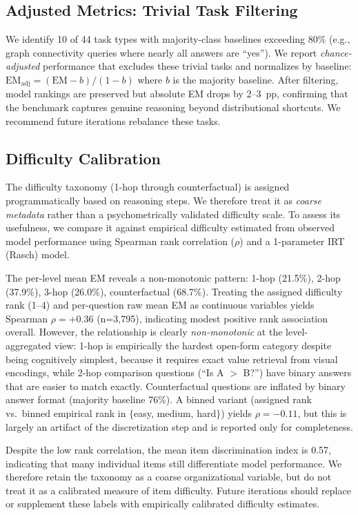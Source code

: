 \documentclass{article}
\begin{document}
\subsection{Adjusted Metrics: Trivial Task Filtering}
We identify 10 of 44 task types with majority-class baselines exceeding 80\% (e.g., graph connectivity queries where nearly all answers are ``yes''). We report \emph{chance-adjusted} performance that excludes these trivial tasks and normalizes by baseline: $\mathrm{EM}_{\mathrm{adj}} = (\mathrm{EM} - b) / (1 - b)$ where $b$ is the majority baseline. After filtering, model rankings are preserved but absolute EM drops by 2--3~pp, confirming that the benchmark captures genuine reasoning beyond distributional shortcuts. We recommend future iterations rebalance these tasks.

\subsection{Difficulty Calibration}
The difficulty taxonomy (1-hop through counterfactual) is assigned programmatically based on reasoning steps. We therefore treat it as \emph{coarse metadata} rather than a psychometrically validated difficulty scale. To assess its usefulness, we compare it against empirical difficulty estimated from observed model performance using Spearman rank correlation ($\rho$) and a 1-parameter IRT (Rasch) model.

The per-level mean EM reveals a non-monotonic pattern: 1-hop (21.5\%), 2-hop (37.9\%), 3-hop (26.0\%), counterfactual (68.7\%). Treating the assigned difficulty rank (1--4) and per-question raw mean EM as continuous variables yields Spearman $\rho = +0.36$ (n=3{,}795), indicating modest positive rank association overall. However, the relationship is clearly \emph{non-monotonic} at the level-aggregated view: 1-hop is empirically the hardest open-form category despite being cognitively simplest, because it requires exact value retrieval from visual encodings, while 2-hop comparison questions (``Is A $>$ B?'') have binary answers that are easier to match exactly. Counterfactual questions are inflated by binary answer format (majority baseline 76\%). A binned variant (assigned rank vs.\ binned empirical rank in $\{$easy, medium, hard$\}$) yields $\rho = -0.11$, but this is largely an artifact of the discretization step and is reported only for completeness.

Despite the low rank correlation, the mean item discrimination index is 0.57, indicating that many individual items still differentiate model performance. We therefore retain the taxonomy as a coarse organizational variable, but do not treat it as a calibrated measure of item difficulty. Future iterations should replace or supplement these labels with empirically calibrated difficulty estimates.
\end{document}
